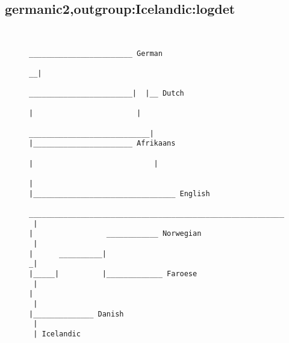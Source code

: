 \subsection{germanic2,outgroup:Icelandic:logdet}
\begin{figure}[H]
\begin{center}
{
\selectfont
\begin{verbatim}

                                                                                                                            ________________________ German
                                                                                                                         __|
                                                                                                ________________________|  |__ Dutch
                                                                                               |                        |
                                                                   ____________________________|                        |_______________________ Afrikaans
                                                                  |                            |
                                                                  |                            |_________________________________ English
  ________________________________________________________________|
 |                                                                |                 ____________ Norwegian
 |                                                                |      __________|
_|                                                                |_____|          |_____________ Faroese
 |                                                                      |
 |                                                                      |______________ Danish
 |
 | Icelandic



\end{verbatim}
}
\label{...}
\end{center}
\end{figure}
